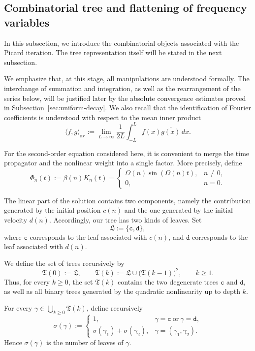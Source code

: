 \documentclass[12pt,reqno,tbtags]{amsart}
\newcommand\1{\mathbbm{1}}
\begin{document}
\subsection{Combinatorial tree and flattening of frequency variables}\label{sec:tree-setup}

In this subsection, we introduce the combinatorial objects associated with the Picard
iteration. The tree representation itself will be stated in the next subsection.

We emphasize that, at this stage, all manipulations are understood formally.
The interchange of summation and integration, as well as the rearrangement of the
series below, will be justified later by the absolute convergence estimates proved in
Subsection~\ref{sec:uniform-decay}. We also recall that the identification of Fourier
coefficients is understood with respect to the mean inner product
\[
\langle f,g\rangle_{\mathrm{av}}
:=
\lim_{L\to\infty}\frac{1}{2L}\int_{-L}^{L} f(x)\overline{g(x)}\,dx .
\]

For the second-order equation considered here, it is convenient to merge the time
propagator and the nonlinear weight into a single factor. More precisely, define
\begin{equation}\label{eq:Phi-definition}
\Phi_n(t):=\beta(n)K_n(t)
=
\begin{cases}
\Omega(n)\sin(\Omega(n)t), & n\neq 0,\\[1mm]
0, & n=0.
\end{cases}
\end{equation}

The linear part of the solution contains two components, namely the contribution
generated by the initial position $c(n)$ and the one generated by the initial
velocity $d(n)$. Accordingly, our tree has two kinds of leaves. Set
\[
\mathfrak{L}:=\{\mathtt{c},\mathtt{d}\},
\]
where $\mathtt{c}$ corresponds to the leaf associated with $c(n)$, and $\mathtt{d}$
corresponds to the leaf associated with $d(n)$.

We define the set of trees recursively by
\begin{equation*}
\mathfrak{T}(0):=\mathfrak{L},
\qquad
\mathfrak{T}(k):=\mathfrak{L}\cup \big(\mathfrak{T}(k-1)\big)^2,
\qquad k\geq 1.
\end{equation*}
Thus, for every $k\geq 0$, the set $\mathfrak{T}(k)$ contains the two degenerate
trees $\mathtt{c}$ and $\mathtt{d}$, as well as all binary trees generated by the
quadratic nonlinearity up to depth $k$.

For every $\gamma\in \bigcup_{k\geq 0}\mathfrak{T}(k)$, define recursively
\begin{equation}\label{eq:sigma-definition}
\sigma(\gamma):=
\begin{cases}
1, & \gamma=\mathtt{c}\ \text{or}\ \gamma=\mathtt{d},\\[1mm]
\sigma(\gamma_1)+\sigma(\gamma_2), & \gamma=(\gamma_1,\gamma_2).
\end{cases}
\end{equation}
Hence $\sigma(\gamma)$ is the number of leaves of $\gamma$.
\end{document}
